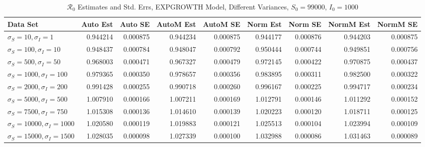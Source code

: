 \documentclass[12pt]{article}
\newcommand{\rr}{\ensuremath{\mathcal{R}_0}}
\begin{document}
\begin{table}[H]
	
	\caption{$\rr$ Estimates and Std. Errs, EXPGROWTH Model, 
		Different Variances, $S_0 = 99000$, $I_0 = 1000$}
	\begin{footnotesize}
		\hskip -1.7cm
	\begin{tabular}{l|r|r|r|r|r|r|r|r}
		\hline
		Data Set & Auto Est & Auto SE & AutoM Est & AutoM SE & Norm Est & Norm SE & NormM Est & NormM SE\\
		\hline
		$\sigma_S = 10, \sigma_I = 1$ & 0.944214 & 0.000875 & 0.944234 & 0.000875 & 0.944177 & 0.000876 & 0.944203 & 0.000875\\
		\hline
		$\sigma_S = 100, \sigma_I = 10$ & 0.948437 & 0.000784 & 0.948047 & 0.000792 & 0.950444 & 0.000744 & 0.949851 & 0.000756\\
		\hline
		$\sigma_S = 500, \sigma_I = 50$ & 0.968003 & 0.000471 & 0.967327 & 0.000479 & 0.972145 & 0.000422 & 0.970875 & 0.000437\\
		\hline
		$\sigma_S = 1000, \sigma_I = 100$ & 0.979365 & 0.000350 & 0.978657 & 0.000356 & 0.983895 & 0.000311 & 0.982500 & 0.000322\\
		\hline
		$\sigma_S = 2000, \sigma_I = 200$ & 0.991428 & 0.000255 & 0.990718 & 0.000260 & 0.996167 & 0.000225 & 0.994717 & 0.000234\\
		\hline
		$\sigma_S = 5000, \sigma_I = 500$ & 1.007910 & 0.000166 & 1.007211 & 0.000169 & 1.012791 & 0.000146 & 1.011292 & 0.000152\\
		\hline
		$\sigma_S = 7500, \sigma_I = 750$ & 1.015308 & 0.000136 & 1.014610 & 0.000139 & 1.020223 & 0.000120 & 1.018711 & 0.000125\\
		\hline
		$\sigma_S = 10000, \sigma_I = 1000$ & 1.020580 & 0.000119 & 1.019883 & 0.000121 & 1.025513 & 0.000104 & 1.023994 & 0.000109\\
		\hline
		$\sigma_S = 15000, \sigma_I = 1500$ & 1.028035 & 0.000098 & 1.027339 & 0.000100 & 1.032988 & 0.000086 & 1.031463 & 0.000089\\
		\hline
	\end{tabular}
\end{footnotesize}
\end{table}
\end{document}

